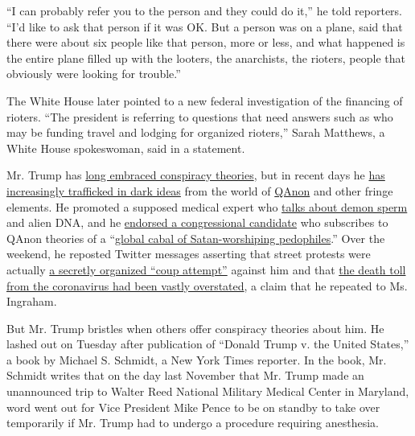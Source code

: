 ``I can probably refer you to the person and they could do it,'' he told
reporters. ``I'd like to ask that person if it was OK. But a person was
on a plane, said that there were about six people like that person, more
or less, and what happened is the entire plane filled up with the
looters, the anarchists, the rioters, people that obviously were looking
for trouble.''

The White House later pointed to a new federal investigation of the
financing of rioters. ``The president is referring to questions that
need answers such as who may be funding travel and lodging for organized
rioters,'' Sarah Matthews, a White House spokeswoman, said in a
statement.

Mr. Trump has
\href{https://www.nytimes3xbfgragh.onion/2020/08/17/us/politics/trump-election.html}{long
embraced conspiracy theories}, but in recent days he
\href{https://www.nytimes3xbfgragh.onion/2020/08/30/us/politics/trump-protests-violence-coronavirus.html}{has
increasingly trafficked in dark ideas} from the world of
\href{https://www.nytimes3xbfgragh.onion/article/what-is-qanon.html}{QAnon}
and other fringe elements. He promoted a supposed medical expert who
\href{https://www.thedailybeast.com/stella-immanuel-trumps-new-covid-doctor-believes-in-alien-dna-demon-sperm-and-hydroxychloroquine}{talks
about demon sperm} and alien DNA, and he
\href{https://www.nytimes3xbfgragh.onion/2020/08/15/us/elections/trump-refrains-from-disavowing-qanon-conspiracy.html}{endorsed
a congressional candidate} who subscribes to QAnon theories of a
``\href{https://www.youtube.com/watch?time_continue=11\&v=2rtYok4fdbQ\&feature=emb_title}{global
cabal of Satan-worshiping pedophiles}.'' Over the weekend, he reposted
Twitter messages asserting that street protests were actually
\href{https://twitter.com/OANN/status/1299045185758703616}{a secretly
organized ``coup attempt''} against him and that
\href{https://twitter.com/JennaEllisEsq/status/1299946852544999424}{the
death toll from the coronavirus had been vastly overstated}, a claim
that he repeated to Ms. Ingraham.

But Mr. Trump bristles when others offer conspiracy theories about him.
He lashed out on Tuesday after publication of ``Donald Trump v. the
United States,'' a book by Michael S. Schmidt, a New York Times
reporter. In the book, Mr. Schmidt writes that on the day last November
that Mr. Trump made an unannounced trip to Walter Reed National Military
Medical Center in Maryland, word went out for Vice President Mike Pence
to be on standby to take over temporarily if Mr. Trump had to undergo a
procedure requiring anesthesia.

